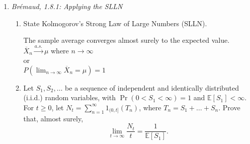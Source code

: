\documentclass{article} %
\begin{document}
\begin{enumerate}
\item {\it Br\'{e}maud, 1.8.1: Applying the SLLN}
  \begin{enumerate}
  \item State Kolmogorov's Strong Law of Large Numbers (SLLN).

  The sample average converges almost surely to the expected value. \\
  $\overline{X}_n \overset{a.s.}{\to} \mu$ where $n \to \infty$ \\
  or \\
  $P(\lim_{n \to \infty} \overline{X}_n = \mu) = 1$

  \item Let $S_1,S_2,\dots$ be a sequence of independent and
    identically distributed (i.i.d.) random variables, with
    $\Pr(0<S_1<\infty)=1$ and $\mathbb{E}[S_1]<\infty$.  For $t\ge 0$,
    let $N_t=\sum_{n=1}^\infty 1_{(0,t]}(T_n)$, where
    $T_n=S_1+\dots+S_n$.  Prove that, almost surely,
    \[
    \lim_{t\to\infty} \frac{N_t}{t} = \frac{1}{\mathbb{E}[S_1]}.
    \]
  \end{enumerate}

\end{enumerate}
\end{document}
